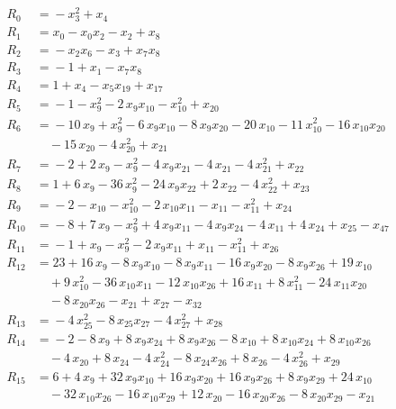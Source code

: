 \begin{align*}
R_{0} &={} -x_{3}^{2} +x_{4} \\[2pt]
R_{1} &={} x_{0} -x_{0} x_{2} -x_{2} +x_{8} \\[2pt]
R_{2} &={} -x_{2} x_{6} -x_{3} +x_{7} x_{8} \\[2pt]
R_{3} &={} -1 +x_{1} -x_{7} x_{8} \\[2pt]
R_{4} &={} 1 +x_{4} -x_{5} x_{19} +x_{17} \\[2pt]
R_{5} &={} -1 -x_{9}^{2} -2\,x_{9} x_{10} -x_{10}^{2} +x_{20} \\[2pt]
R_{6} &={} -10\,x_{9} +x_{9}^{2} -6\,x_{9} x_{10} -8\,x_{9} x_{20} -20\,x_{10} -11\,x_{10}^{2} -16\,x_{10} x_{20} \\
&\quad{} -15\,x_{20} -4\,x_{20}^{2} +x_{21} \\[2pt]
R_{7} &={} -2 +2\,x_{9} -x_{9}^{2} -4\,x_{9} x_{21} -4\,x_{21} -4\,x_{21}^{2} +x_{22} \\[2pt]
R_{8} &={} 1 +6\,x_{9} -36\,x_{9}^{2} -24\,x_{9} x_{22} +2\,x_{22} -4\,x_{22}^{2} +x_{23} \\[2pt]
R_{9} &={} -2 -x_{10} -x_{10}^{2} -2\,x_{10} x_{11} -x_{11} -x_{11}^{2} +x_{24} \\[2pt]
R_{10} &={} -8 +7\,x_{9} -x_{9}^{2} +4\,x_{9} x_{11} -4\,x_{9} x_{24} -4\,x_{11} +4\,x_{24} +x_{25} -x_{47} \\[2pt]
R_{11} &={} -1 +x_{9} -x_{9}^{2} -2\,x_{9} x_{11} +x_{11} -x_{11}^{2} +x_{26} \\[2pt]
R_{12} &={} 23 +16\,x_{9} -8\,x_{9} x_{10} -8\,x_{9} x_{11} -16\,x_{9} x_{20} -8\,x_{9} x_{26} +19\,x_{10} \\
&\quad{} +9\,x_{10}^{2} -36\,x_{10} x_{11} -12\,x_{10} x_{26} +16\,x_{11} +8\,x_{11}^{2} -24\,x_{11} x_{20} \\
&\quad{} -8\,x_{20} x_{26} -x_{21} +x_{27} -x_{32} \\[2pt]
R_{13} &={} -4\,x_{25}^{2} -8\,x_{25} x_{27} -4\,x_{27}^{2} +x_{28} \\[2pt]
R_{14} &={} -2 -8\,x_{9} +8\,x_{9} x_{24} +8\,x_{9} x_{26} -8\,x_{10} +8\,x_{10} x_{24} +8\,x_{10} x_{26} \\
&\quad{} -4\,x_{20} +8\,x_{24} -4\,x_{24}^{2} -8\,x_{24} x_{26} +8\,x_{26} -4\,x_{26}^{2} +x_{29} \\[2pt]
R_{15} &={} 6 +4\,x_{9} +32\,x_{9} x_{10} +16\,x_{9} x_{20} +16\,x_{9} x_{26} +8\,x_{9} x_{29} +24\,x_{10} \\
&\quad{} -32\,x_{10} x_{26} -16\,x_{10} x_{29} +12\,x_{20} -16\,x_{20} x_{26} -8\,x_{20} x_{29} -x_{21} \\

\end{align*}
